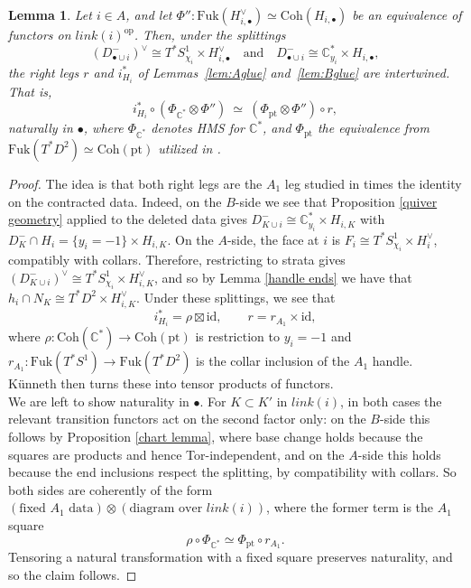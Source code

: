 \documentclass[11pt]{amsart}
\newtheorem{lem}[thm]{Lemma}
\theoremstyle{definition}
\theoremstyle{remark}
\newcommand{\C}{\mathbb{C}}
\newcommand{\Coh}{\mathrm{Coh}}
\newcommand{\Fuk}{\mathrm{Fuk}}
\numberwithin{equation}{section}
\begin{document}
\begin{lem}\label{lem:Hleg}
Let $i\in A$, and let $\Phi''\colon \Fuk(H^\vee_{i,\bullet})\simeq \Coh(H_{i,\bullet})$ be an equivalence of functors on $link(i)^{\mathrm{op}}$. Then, under the splittings
$$
(D^-_{\bullet\cup i})^\vee\cong T^*S^1_{\chi_i}\times H^\vee_{i,\bullet}\quad \text{and} \quad D^-_{\bullet\cup i}\cong\C^*_{y_i}\times H_{i,\bullet},$$
the right legs $r$ and $i^*_{H_i}$ of Lemmas~\ref{lem:Aglue} and~\ref{lem:Bglue} are intertwined. That is,
$$
i^*_{H_i}\circ(\Phi_{\C^*}\otimes\Phi'')\ \simeq\ (\Phi_{\mathrm{pt}}\otimes\Phi'')\circ r,
$$
naturally in $\bullet$, where $\Phi_{\C^*}$ denotes HMS for $\C^*$, and $\Phi_{\mathrm{pt}}$ the equivalence from $\Fuk(T^*D^2)\simeq \Coh(\mathrm{pt})$ utilized in 
\cite{GL}.
\end{lem}
 
\begin{proof}
The idea is that both right legs are the $A_1$ leg studied in \cite{GL} times the identity on the contracted data. Indeed, on the $B$-side we see that Proposition \ref{quiver geometry} applied to the deleted data gives $D^-_{K\cup i} \cong \mathbb{C}^*_{y_i} \times H_{i,K}$ with $D^-_K\cap H_i=\{y_i=-1\}\times H_{i,K}$. On the $A$-side, the face at $i$ is $F_i\cong T^*S^1_{\chi_i}\times H_i^\vee$, compatibly with collars. Therefore, restricting to strata gives $(D^-_{K\cup i})^\vee\cong T^*S^1_{\chi_i}\times H^\vee_{i,K}$, and so by Lemma \ref{handle ends} we have that $h_i\cap N_K\cong T^*D^2\times H^\vee_{i,K}$. Under these splittings, we see that
$$
i^*_{H_i}=\rho\boxtimes\mathrm{id},\qquad r=r_{A_1}\times\mathrm{id},
$$
\noindent where $\rho\colon \Coh(\C^*)\to \Coh(\mathrm{pt})$ is restriction to $y_i=-1$ and $r_{A_1}\colon \Fuk(T^*S^1)\to \Fuk(T^*D^2)$ is the collar inclusion of the $A_1$ handle. K\"unneth then turns these into tensor products of functors.\\
 
We are left to show naturality in $
\bullet$. For $K\subset K'$ in $link(i)$, in both cases the relevant transition functors act on the second factor only: on the $B$-side this follows by Proposition 
\ref{chart lemma}, where base change holds because the squares are products and hence Tor-independent, and on the 
$A$-side this holds because the end inclusions respect the splitting, by compatibility with collars. So both sides are coherently of the form $(\text{fixed }A_1\text{ data})\otimes(\text{diagram over } link(i))$, where the former term is the $A_1$ square
$$
\rho\circ\Phi_{\C^*}\simeq\Phi_{\mathrm{pt}}\circ r_{A_1}.
$$
Tensoring a natural transformation with a fixed square preserves naturality, and so the claim follows.
\end{proof}
\end{document}
